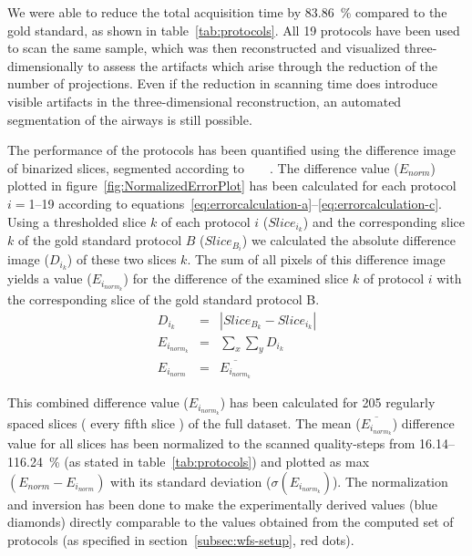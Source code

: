 We were able to reduce the total acquisition time by \SI{83.86}{\percent} compared to the gold standard, as shown in table~\ref{tab:protocols}. All 19 protocols have been used to scan the same sample, which was then reconstructed and visualized three-dimensionally to assess the artifacts which arise through the reduction of the number of projections. Even if the reduction in scanning time does introduce visible artifacts in the three-dimensional reconstruction, an automated segmentation of the airways is still possible.

The performance of the protocols has been quantified using the difference image of binarized slices, segmented according to%
\ifhtml%
	~\citet{Otsu1979}%
\else%
	~%
\fi%
. %
The difference value ($E_{norm}$) plotted in figure~\ref{fig:NormalizedErrorPlot} has been calculated for each protocol $i=$1--19 according to equations~\ref{eq:errorcalculation-a}--\ref{eq:errorcalculation-c}. Using a thresholded slice $k$ of each protocol $i$ ($Slice_{i_{k}}$) and the corresponding slice $k$ of the gold standard protocol $B$ ($Slice_{B_{i}}$) we calculated the absolute difference image ($D_{i_{k}}$) of these two slices $k$. The sum of all pixels of this difference image yields a value ($E_{i_{norm_{k}}}$) for the difference of the examined slice $k$ of protocol $i$ with the corresponding slice of the gold standard protocol B.
\begin{eqnarray}%
	D_{i_{k}} &=& |Slice_{B_{k}}-Slice_{i_{k}}|\label{eq:errorcalculation-a}\\%
	E_{i_{norm_{k}}} &=& \sum_{x}\sum_{y} D_{i_{k}}\label{eq:errorcalculation-b}\\%
	E_{i_{norm}} &=& \overline{E_{i_{norm_{k}}}}\label{eq:errorcalculation-c}%
\end{eqnarray}%

This combined difference value ($E_{i_{norm_{k}}}$) has been calculated for 205 regularly spaced slices (%
every fifth slice%
) of the full dataset. The mean ($\overline{E_{i_{norm_{k}}}}$) difference value for all slices has been normalized to the scanned quality-steps from 16.14--\SI{116.24}{\percent} (as stated in table~\ref{tab:protocols}) and plotted as max$(E_{norm}-E_{i_{norm}})$ with its standard deviation ($\sigma(E_{i_{norm_{k}}})$). The normalization and inversion has been done to make the experimentally derived values (blue diamonds) directly comparable to the values obtained from the computed set of protocols (as specified in section~\ref{subsec:wfs-setup}, red dots).

